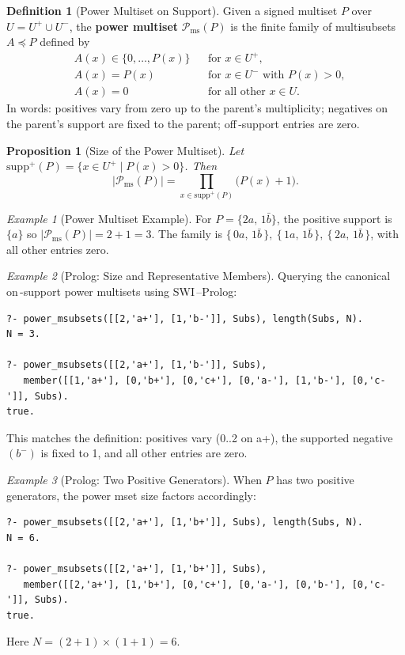 \documentclass{article}
\theoremstyle{plain}
\newtheorem{proposition}{Proposition}
\theoremstyle{definition}
\newtheorem{definition}{Definition}
\theoremstyle{remark}
\newtheorem{example}{Example}
\begin{document}
\begin{definition}[Power Multiset on Support]
Given a signed multiset \(P\) over \(U = U^+ \cup U^-\), the \textbf{power multiset} \(\mathcal{P}_\mathrm{ms}(P)\) is the finite family of multisubsets \(A\preceq P\) defined by
\[
\begin{aligned}
&A(x) \in \{0,\dots,P(x)\} && \text{for } x\in U^+,\\
&A(x) = P(x) && \text{for } x\in U^- \text{ with } P(x)>0,\\
&A(x) = 0 && \text{for all other } x\in U.
\end{aligned}
\]
In words: positives vary from zero up to the parent’s multiplicity; negatives on the parent’s support are fixed to the parent; off\,-support entries are zero.
\end{definition}

\begin{proposition}[Size of the Power Multiset]
Let \(\mathrm{supp}^+(P)=\{x\in U^+\mid P(x)>0\}\). Then
\[
\big\lvert \mathcal{P}_\mathrm{ms}(P) \big\rvert = \prod_{x\in \mathrm{supp}^+(P)} \big( P(x) + 1 \big).
\]
\end{proposition}

\begin{example}[Power Multiset Example]
For \(P = \{2a,\,1\bar{b}\}\), the positive support is \(\{a\}\) so
\(\lvert \mathcal{P}_\mathrm{ms}(P) \rvert = 2+1 = 3\). The family is
\(\{\,0a,\,1\bar{b}\,\},\ \{\,1a,\,1\bar{b}\,\},\ \{\,2a,\,1\bar{b}\,\}\),
with all other entries zero.
\end{example}

\begin{example}[Prolog: Size and Representative Members]
Querying the canonical on\,-support power multisets using SWI\,--Prolog:
{\small\begin{verbatim}
?- power_msubsets([[2,'a+'], [1,'b-']], Subs), length(Subs, N).
N = 3.

?- power_msubsets([[2,'a+'], [1,'b-']], Subs),
   member([[1,'a+'], [0,'b+'], [0,'c+'], [0,'a-'], [1,'b-'], [0,'c-']], Subs).
true.
\end{verbatim}
}
This matches the definition: positives vary (0..2 on a+), the supported negative \((b^-)\) is fixed to 1, and all other entries are zero.
\end{example}

\begin{example}[Prolog: Two Positive Generators]
When \(P\) has two positive generators, the power mset size factors accordingly:
{\small\begin{verbatim}
?- power_msubsets([[2,'a+'], [1,'b+']], Subs), length(Subs, N).
N = 6.

?- power_msubsets([[2,'a+'], [1,'b+']], Subs),
   member([[2,'a+'], [1,'b+'], [0,'c+'], [0,'a-'], [0,'b-'], [0,'c-']], Subs).
true.
\end{verbatim}
}
Here \(N = (2+1)\times(1+1) = 6\).
\end{example}
\end{document}
